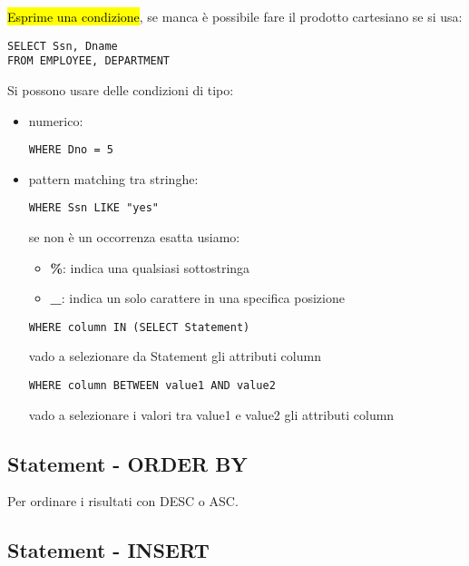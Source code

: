 \hl{Esprime una condizione}, se manca è possibile fare il prodotto cartesiano se si usa:

\begin{lstlisting}
SELECT Ssn, Dname
FROM EMPLOYEE, DEPARTMENT
\end{lstlisting}

Si possono usare delle condizioni di tipo:

\begin{itemize}
	\item numerico:

\begin{lstlisting}
WHERE Dno = 5
\end{lstlisting}

	\item pattern matching tra stringhe:

\begin{lstlisting}
WHERE Ssn LIKE "yes"
\end{lstlisting}
	
		se non è un occorrenza esatta usiamo:

			\begin{itemize}
				\item \textbf{\%}: indica una qualsiasi sottostringa
				\item \textbf{\_}: indica un solo carattere in una specifica posizione
			\end{itemize}

\begin{lstlisting}
WHERE column IN (SELECT Statement)
\end{lstlisting}

vado a selezionare da Statement gli attributi column


\begin{lstlisting}
WHERE column BETWEEN value1 AND value2
\end{lstlisting}

vado a selezionare i valori tra value1 e value2 gli attributi column

\end{itemize}


\subsection{Statement - ORDER BY}

Per ordinare i risultati con DESC o ASC.


\subsection{Statement - INSERT}

